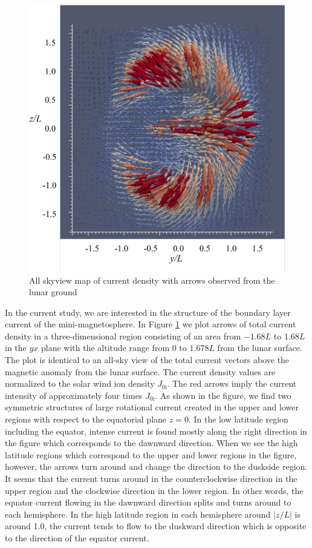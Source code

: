 \documentclass[draft,jgrga]{agutex2015}
\begin{document}
\begin{article}

\begin{figure}[h]
\centering
\noindent\includegraphics[width=12cm]{./figures/Fig_4_bb-crop.pdf}
\caption{All skyview map of current density with arrows 
observed from the lunar ground}\label{fig:4}
\end{figure}

In the current study, 
we are interested in the structure of the boundary layer current  
of the mini-magnetosphere.
In Figure \ref{fig:4} 
we plot arrows of total current density in a three-dimensional region 
consisting of an area from $-1.68L$ to $1.68L$ in the $yx$ plane
with the altitude range from 0 to $1.678L$ from the lunar surface.
The plot is identical to an all-sky view of the total current vectors
above the magnetic anomaly from the lunar surface.
The current density values are normalized to 
the solar wind ion density $J_\mathrm{0i}$.
The red arrows imply the current intensity of approximately four times $J_\mathrm{0i}$.
As shown in the figure, 
we find two symmetric structures of large rotational current 
created in the upper and lower regions 
with respect to the equatorial plane $z=0$.
In the low latitude region including the equator, 
intense current is found mostly along the right direction in the figure
which corresponds to the dawnward direction.
When we see the high latitude regions 
which correspond to the upper and lower regions in the figure,
however, the arrows turn around and change the direction to the duskside region. 
It seems that the current turns around in the counterclockwise direction 
in the upper region and the clockwise direction in the lower region.
In other words, the equator current flowing in the dawnward direction 
splits and turns around to each hemisphere.
In the high latitude region in each hemisphere around $|z/L|$ is around 1.0, 
the current tends to flow to the duskward direction which is opposite to the 
direction of the equator current.


\end{article}
\end{document}
